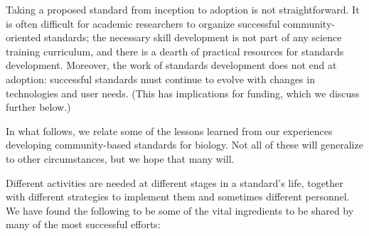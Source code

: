 Taking a proposed standard from inception to adoption is not straightforward.  It is often difficult for academic researchers to organize successful community-oriented standards; the necessary skill development is not part of any science training curriculum, and there is a dearth of practical resources for standards development.  Moreover, the work of standards development does not end at adoption: successful standards must continue to evolve with changes in technologies and user needs.  (This has implications for funding, which we discuss further below.)

In what follows, we relate some of the lessons learned from our experiences developing community-based standards for biology.  Not all of these will generalize to other circumstances, but we hope that many will.




Different activities are needed at different stages in a standard's life, together with different strategies to implement them and sometimes different personnel.  We have found the following to be some of the vital ingredients to be shared by many of the most successful efforts:

